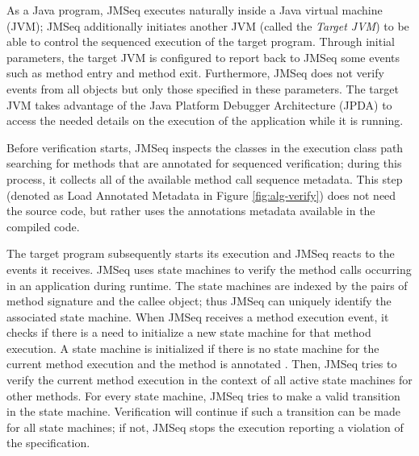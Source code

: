 As a Java program, JMSeq executes naturally inside a Java virtual machine (JVM); JMSeq additionally initiates another JVM (called the \textsl{Target JVM}) to be able to control the sequenced execution of the target program.
Through initial parameters, the target JVM is configured to report back to JMSeq some events such as method entry and method exit.
Furthermore, JMSeq does not verify events from all objects but only those specified in these parameters. 
The target JVM takes advantage of the Java Platform Debugger Architecture (JPDA) to access the needed details on the execution of the application while it is running. 

Before verification starts, JMSeq inspects the classes in the execution class path searching for methods that are annotated for sequenced verification; during this process, it collects all of the available method call sequence metadata. 
This step (denoted as Load Annotated Metadata in Figure \ref{fig:alg-verify}) does not need the source code, but rather uses the annotations metadata available in the compiled code.

The target program subsequently starts its execution and JMSeq reacts to the events it receives.
JMSeq uses state machines to verify the method calls occurring in an application during runtime.
The state machines are indexed by the pairs of method signature and the callee object; thus JMSeq can uniquely identify the associated state machine.
When JMSeq receives a method execution event, it checks if there is a need to initialize a new state machine for that method execution.
A state machine is initialized if there is no state machine for the current method execution and the method is annotated  .
Then, JMSeq tries to verify the current method execution in the context of all active state machines for other methods.
For every state machine, JMSeq tries to make a valid transition in the state machine. 
Verification will continue if such a transition can be made for all state machines; 
if not, JMSeq stops the execution reporting a violation of the specification. 

